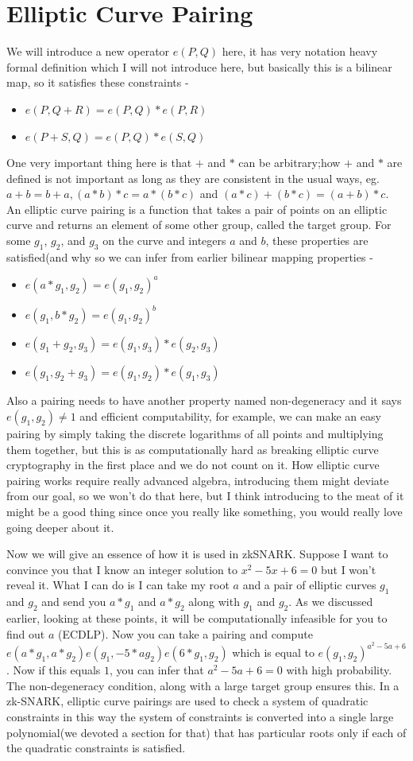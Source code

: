 \documentclass[12pt,letterpaper]{article}
\begin{document}
\section{Elliptic Curve Pairing}
We will introduce a new operator $e(P,Q)$ here, it has very notation heavy formal definition which I will not introduce here, but basically this is a bilinear map, so it satisfies these constraints - 
\begin{itemize}
    \item $e(P, Q + R) = e(P, Q) * e(P, R)$
    \item $e(P + S, Q) = e(P, Q) * e(S, Q)$
\end{itemize}
One very important thing here is that $+$ and $*$ can be arbitrary;how $+$ and $*$ are defined is not important as long as they are consistent in the usual ways, eg. $a + b = b + a, (a * b) * c = a * (b * c)$ and $(a * c) + (b * c) = (a + b) * c$. An elliptic curve pairing is a function that takes a pair of points on an elliptic curve and returns an element of some other group, called the target group. For some $g_1$, $g_2$, and $g_3$ on the curve and integers $a$ and $b$, these properties are satisfied(and why so we can infer from earlier bilinear mapping properties - 
\begin{itemize}
    \item $e(a*g_1,g_2)=e(g_1,g_2)^a$
    \item $e(g_1,b*g_2)=e(g_1,g_2)^b$
    \item $e(g_1+g_2,g_3)=e(g_1,g_3)*e(g_2,g_3)$
    \item $e(g_1,g_2+g_3)=e(g_1,g_2)*e(g_1,g_3)$
\end{itemize}
Also a pairing needs to have another property named non-degeneracy and it says $e(g_1,g_2)\ne 1$ and efficient computability, for example, we can make an easy pairing by simply taking the discrete logarithms of all points and multiplying them together, but this is as computationally hard as breaking elliptic curve cryptography in the first place and we do not count on it. How elliptic curve pairing works require really advanced algebra, introducing them might deviate from our goal, so we won't do that here, but I think introducing to the meat of it might be a good thing since once you really like something, you would really love going deeper about it. 

Now we will give an essence of how it is used in zkSNARK. Suppose I want to convince you that I know an integer solution to $x^2-5x+6=0$ but I won't reveal it. What I can do is I can take my root $a$ and a pair of elliptic curves $g_1$ and $g_2$ and send you $a*g_1$ and $a*g_2$ along with $g_1$ and $g_2$. As we discussed earlier, looking at these points, it will be computationally infeasible for you to find out $a$ (ECDLP). Now you can take a pairing and compute $e(a*g_1,a*g_2)e(g_1,-5*ag_2)e(6*g_1,g_2)$ which is equal to $e(g_1,g_2)^{a^2-5a+6}$. Now if this equals $1$, you can infer that $a^2-5a+6=0$ with high probability. The non-degeneracy condition, along with a large target group ensures this. In a zk-SNARK, elliptic curve pairings are used to check a system of quadratic constraints in this way the system of constraints is converted into a single large polynomial(we devoted a section for that) that has particular roots only if each of the quadratic constraints is satisfied.
\end{document}
